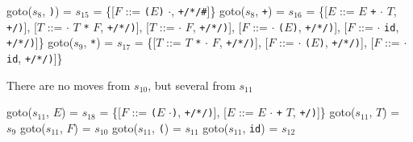 \documentclass[8pt,a4paper,compress]{beamer}
\newcommand{\mm}[1]{$#1$}
\newcommand{\subs}[2]{${#1}_{#2}$}
\newenvironment{spaced}
{
\smallskip
\hspace{.5cm}
\begin{minipage}[c]{\textwidth}
}
{
\end{minipage}
\smallskip
}
\begin{document}
\begin{frame}[fragile]
\pause

\text{ }
\begin{spaced}
\begin{production}
goto(\subs{s}{8}, \lstinline{)}) = \subs{s}{15}
               = \{[\mm{F}  ::= \lstinline{(}\mm{E}\lstinline{)} \mm{\cdot},  \lstinline{+/*/#}]\}
goto(\subs{s}{8}, \lstinline{+}) = \subs{s}{16}
               = \{[\mm{E}  ::= \mm{E} \lstinline{+} \mm{\cdot} \mm{T}, \lstinline{+/)}],
                    [\mm{T}  ::= \mm{\cdot} \mm{T} \lstinline{*} \mm{F}, \lstinline{+/*/)}],
                    [\mm{T}  ::= \mm{\cdot} \mm{F}, \lstinline{+/*/)}],
                    [\mm{F}  ::= \mm{\cdot} \lstinline{(}\mm{E}\lstinline{)}, \lstinline{+/*/)}],
                    [\mm{F}  ::= \mm{\cdot} \lstinline{id}, \lstinline{+/*/)}]\}
goto(\subs{s}{9}, \lstinline{*}) = \subs{s}{17}
               = \{[\mm{T}  ::= \mm{T} \lstinline{*} \mm{\cdot} \mm{F}, \lstinline{+/*/)}],
                    [\mm{F}  ::= \mm{\cdot} \lstinline{(}\mm{E}\lstinline{)}, \lstinline{+/*/)}],
                    [\mm{F}  ::= \mm{\cdot} \lstinline{id}, \lstinline{+/*/)}]\}
\end{production}
\end{spaced}

\pause

There are no moves from $s_{10}$, but several from $s_{11}$

\text{ }
\begin{spaced}
\begin{production}
goto(\subs{s}{11}, \mm{E}) = \subs{s}{18}
                 = \{[\mm{F}  ::= \lstinline{(}\mm{E} \mm{\cdot}\lstinline{)}, \lstinline{+/*/)}],
                     [\mm{E}  ::= \mm{E} \mm{\cdot} \lstinline{+} \mm{T}, \lstinline{+/)}]\}
goto(\subs{s}{11}, \mm{T}) = \subs{s}{9}
goto(\subs{s}{11}, \mm{F}) = \subs{s}{10}
goto(\subs{s}{11}, \lstinline{(}) = \subs{s}{11}
goto(\subs{s}{11}, \lstinline{id}) = \subs{s}{12}
\end{production}
\end{spaced}
\end{frame}
\end{document}
